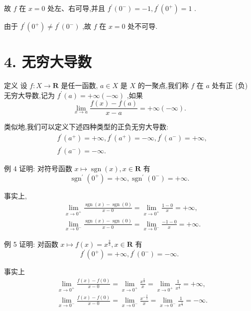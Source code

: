 故 $f$ 在 $x = 0$ 处左、右可导,并且 ${f}^{\prime }\left( {0}^{ - }\right)  =  - 1,{f}^{\prime }\left( {0}^{ + }\right)  = 1$ .

由于 ${f}^{\prime }\left( {0}^{ + }\right)  \neq  {f}^{\prime }\left( {0}^{ - }\right)$ ,故 $f$ 在 $x = 0$ 处不可导.

\section*{4. 无穷大导数}

定义 设 $f : X \rightarrow  \mathbf{R}$ 是任一函数, $a \in  X$ 是 $X$ 的一聚点,我们称 $f$ 在 $a$ 处有正 (负) 无穷大导数,记为 ${f}^{\prime }\left( a\right)  =  + \infty \left( {-\infty }\right)$ ,如果
$$\mathop{\lim }\limits_{{x \rightarrow  a}}\frac{f\left( x\right)  - f\left( a\right) }{x - a} =  + \infty \left( {-\infty }\right) .$$

类似地,我们可以定义下述四种类型的正负无穷大导数:
\begin{align*}
	&{f}^{\prime }\left( {a}^{ + }\right)  =  + \infty ,{f}^{\prime }\left( {a}^{ + }\right)  =  - \infty ,{f}^{\prime }\left( {a}^{ - }\right)  =  + \infty ,\\
	&{f}^{\prime }\left( {a}^{ - }\right)  =  - \infty .
\end{align*}

例 4 证明: 对符号函数 $x \mapsto  \operatorname{sgn}\left( x\right) ,x \in  \mathbf{R}$ 有
$${\operatorname{sgn}}^{\prime }\left( {0}^{ + }\right)  =  + \infty ,{\operatorname{sgn}}^{\prime }\left( {0}^{ - }\right)  =  + \infty .$$

事实上,
\begin{align*}
	&\mathop{\lim }\limits_{{x \rightarrow  {0}^{ + }}}\frac{\operatorname{sgn}\left( x\right)  - \operatorname{sgn}\left( 0\right) }{x - 0} = \mathop{\lim }\limits_{{x \rightarrow  {0}^{ + }}}\frac{1 - 0}{x} =  + \infty ,\\
	&\mathop{\lim }\limits_{{x \rightarrow  {0}^{ - }}}\frac{\operatorname{sgn}\left( x\right)  - \operatorname{sgn}\left( 0\right) }{x - 0} = \mathop{\lim }\limits_{{x \rightarrow  {0}^{ - }}}\frac{-1 - 0}{x} =  + \infty .
\end{align*}

例 5 证明: 对函数 $x \mapsto  f\left( x\right)  = {x}^{\frac{2}{3}},x \in  \mathbf{R}$ 有
$${f}^{\prime }\left( {0}^{ + }\right)  =  + \infty ,{f}^{\prime }\left( {0}^{ - }\right)  =  - \infty .$$

事实上
\begin{align*}
	&\mathop{\lim }\limits_{{x \rightarrow  {0}^{ + }}}\frac{f\left( x\right)  - f\left( 0\right) }{x - 0} = \mathop{\lim }\limits_{{x \rightarrow  {0}^{ + }}}\frac{{x}^{\frac{2}{3}}}{x} = \mathop{\lim }\limits_{{x \rightarrow  {0}^{ + }}}\frac{1}{{x}^{\frac{1}{3}}} =  + \infty ,\\
	&\mathop{\lim }\limits_{{x \rightarrow  {0}^{ - }}}\frac{f\left( x\right)  - f\left( 0\right) }{x - 0} = \mathop{\lim }\limits_{{x \rightarrow  {0}^{ - }}}\frac{{x}^{-\frac{2}{3}}}{x} = \mathop{\lim }\limits_{{x \rightarrow  {0}^{ - }}}\frac{1}{{x}^{\frac{1}{3}}} =  - \infty .
\end{align*}


